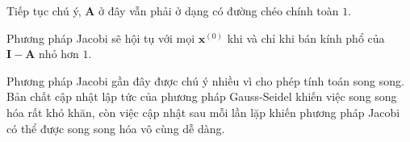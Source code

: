 \documentclass[../../Lectures]{subfiles}
\begin{document}
Tiếp tục chú ý, \(\bm{A}\) ở đây vẫn phải ở dạng có đường chéo chính toàn \(1\).

Phương pháp Jacobi sẽ hội tụ với mọi \(\bm{x}^{(0)}\) khi và chỉ khi bán kính
phổ của \(\bm{I} - \bm{A}\) nhỏ hơn \(1\).

Phương pháp Jacobi gần đây được chú ý nhiều vì cho phép tính toán song song. Bản
chất cập nhật lập tức của phương pháp Gauss-Seidel khiến việc song song hóa rất
khó khăn, còn việc cập nhật sau mỗi lần lặp khiến phương pháp Jacobi có thể được
song song hóa vô cùng dễ dàng.
\end{document}
